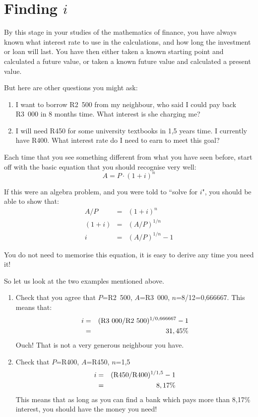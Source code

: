 \section{Finding $i$}
\label{sec:m:f11:interest}
By this stage in your studies of the mathematics of finance, you have always known what interest rate to use in the calculations, and how long the investment or loan will last. You have then either taken a known starting point and calculated a future value, or taken a known future value and calculated a present value.

But here are other questions you might ask:
\begin{enumerate}
\item{I want to borrow R2~500 from my neighbour, who said I could pay back R3~000 in 8 months time. What interest is she charging me?}
\item{I will need R450 for some university textbooks in 1,5 years time. I currently have R400. What interest rate do I need to earn to meet this goal?}
\end{enumerate}

Each time that you see something different from what you have seen before, start off with the basic equation that you should recognise very well:
\begin{equation*}
A = P \cdot (1+i)^n
\end{equation*}

If this were an algebra problem, and you were told to ``solve for $i$", you should be able to show that:
\begin{eqnarray*}
A/P &=& (1+i)^n\\
(1+i) &=& (A/P)^{1/n}\\
i &=& (A/P)^{1/n} - 1
\end{eqnarray*}

You do not need to memorise this equation, it is easy to derive any time you need it!

So let us look at the two examples mentioned above.

\begin{enumerate}
\item{Check that you agree that $P$=R2~500, $A$=R3~000, $n$=8/12=0,666667. This means that:
\begin{eqnarray*}
i &=& (\rm{R}3~000/\rm{R}2~500)^{1/0,666667} - 1\\
&=& 31,45\%
\end{eqnarray*}
Ouch! That is not a very generous neighbour you have.}

\item{Check that $P$=R400, $A$=R450, $n$=1,5
\begin{eqnarray*}
i &=& (\rm{R}450/\rm{R}400)^{1/1,5} - 1\\
&=& 8,17\%
\end{eqnarray*}
This means that as long as you can find a bank which pays more than 8,17\% interest, you should have the money you need!}
\end{enumerate}


